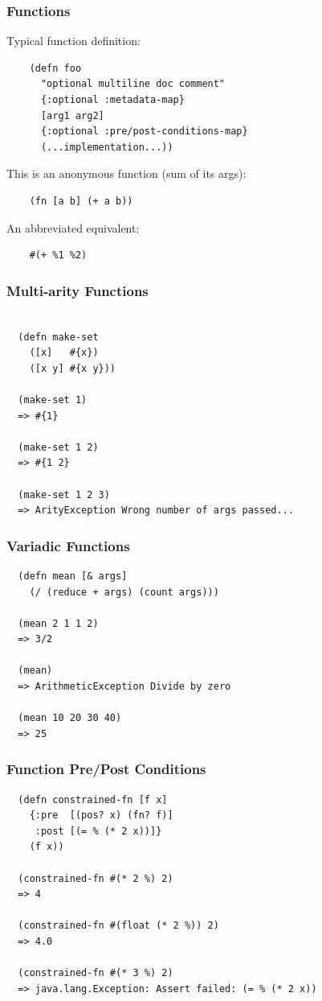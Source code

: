 \documentclass{beamer}
\begin{document}
\begin{frame}[fragile]
  \frametitle{Functions}
  Typical function definition:
  \begin{verbatim}
    (defn foo 
      "optional multiline doc comment"
      {:optional :metadata-map} 
      [arg1 arg2]
      {:optional :pre/post-conditions-map}
      (...implementation...))
  \end{verbatim}

  \vspace{1 cm}


  This is an anonymous function (sum of its args):
  \begin{verbatim}
    (fn [a b] (+ a b))   
  \end{verbatim}
  \vspace{1 cm}

  An abbreviated equivalent:
  \begin{verbatim}
    #(+ %1 %2)
  \end{verbatim}
\end{frame}

\begin{frame}[fragile]
  \frametitle{Multi-arity Functions}
  \begin{verbatim}
  
  (defn make-set 
    ([x]   #{x}) 
    ([x y] #{x y}))

  (make-set 1)
  => #{1}

  (make-set 1 2)
  => #{1 2}
  
  (make-set 1 2 3)
  => ArityException Wrong number of args passed...
\end{verbatim}
\end{frame}

\begin{frame}[fragile]
  \frametitle{Variadic Functions}
  \begin{verbatim}
  (defn mean [& args]
    (/ (reduce + args) (count args)))

  (mean 2 1 1 2)
  => 3/2

  (mean)
  => ArithmeticException Divide by zero

  (mean 10 20 30 40)
  => 25
  \end{verbatim}
\end{frame}

\begin{frame}[fragile]
  \frametitle{Function Pre/Post Conditions}
  \begin{verbatim}
  (defn constrained-fn [f x]
    {:pre  [(pos? x) (fn? f)]
     :post [(= % (* 2 x))]}
    (f x))

  (constrained-fn #(* 2 %) 2)
  => 4

  (constrained-fn #(float (* 2 %)) 2)
  => 4.0

  (constrained-fn #(* 3 %) 2)
  => java.lang.Exception: Assert failed: (= % (* 2 x))
  \end{verbatim}
\end{frame}
\end{document}
